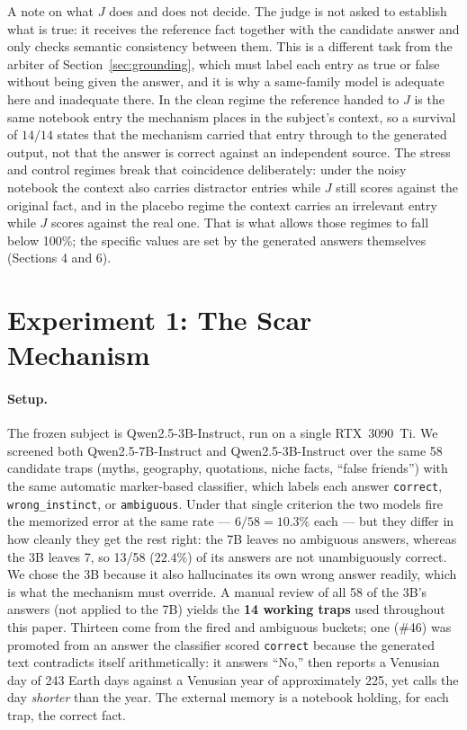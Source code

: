 \documentclass[11pt]{article}
\begin{document}
A note on what $J$ does and does not decide. The judge is not asked to establish
what is true: it receives the reference fact together with the candidate answer
and only checks semantic consistency between them. This is a different task from
the arbiter of Section~\ref{sec:grounding}, which must label each entry as true
or false without being given the answer, and it is why a
same-family model is adequate here and inadequate there. In the clean regime the
reference handed to $J$ is the same notebook entry the mechanism places in the
subject's context, so a survival of $14/14$ states that the mechanism carried
that entry through to the generated output, not that the answer is correct
against an independent source. The stress and control regimes break that
coincidence deliberately: under the noisy notebook the context also carries
distractor entries while $J$ still scores against the original fact, and in the
placebo regime the context carries an irrelevant entry while $J$ scores against
the real one. That is what allows those regimes to fall below 100\%; the
specific values are set by the generated answers themselves (Sections 4 and 6).

\section{Experiment 1: The Scar Mechanism}
\label{sec:exp1}

\paragraph{Setup.} The frozen subject is Qwen2.5-3B-Instruct, run on a single
RTX~3090~Ti. We screened both Qwen2.5-7B-Instruct and Qwen2.5-3B-Instruct over the
same 58 candidate traps (myths, geography, quotations, niche facts, ``false
friends'') with the same automatic marker-based classifier, which labels each
answer \texttt{correct}, \texttt{wrong\_instinct}, or \texttt{ambiguous}. Under
that single criterion the two models fire the memorized error at the same rate
--- $6/58 = 10.3\%$ each --- but they differ in how cleanly they get the rest
right: the 7B leaves no ambiguous answers, whereas the 3B leaves 7, so 13/58
($22.4\%$) of its answers are not unambiguously correct. We chose the 3B because
it also hallucinates its own wrong answer readily, which is what the mechanism
must override. A manual review of all 58 of the 3B's answers (not applied to
the 7B) yields the \textbf{14 working traps} used throughout this paper.
Thirteen come from the fired and ambiguous buckets; one (\#46) was promoted from
an answer the classifier scored \texttt{correct} because the generated text
contradicts itself arithmetically: it answers ``No,'' then reports a Venusian day
of 243 Earth days against a Venusian year of approximately 225, yet calls the day
\emph{shorter} than the year. The external memory is a
notebook holding, for each trap, the correct fact.
\end{document}
